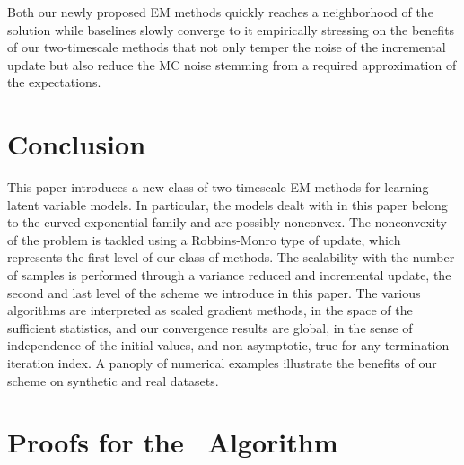 \documentclass[12pt]{article}
\begin{document}
Both our newly proposed EM methods quickly reaches a neighborhood of the solution while baselines slowly converge to it empirically stressing on the benefits of our two-timescale methods that not only temper the noise of the incremental update but also reduce the MC noise stemming from a required approximation of the expectations.



\vspace{-0.05in}
\section{Conclusion}
\vspace{-0.05in}

This paper introduces a new class of two-timescale EM methods for learning latent variable models.
In particular, the models dealt with in this paper belong to the curved exponential family and are possibly nonconvex.
The nonconvexity of the problem is tackled using a Robbins-Monro type of update, which represents the {first level} of our class of methods.
The scalability with the number of samples is performed through a variance reduced and incremental update, the {second} and last level of the scheme we introduce in this paper.
The various algorithms are interpreted as scaled gradient methods, in the space of the sufficient statistics, and our convergence results are {global}, in the sense of independence of the initial values, and {non-asymptotic}, \ie true for any termination iteration index.
A panoply of numerical examples illustrate the benefits of our scheme on synthetic and real datasets.





\newpage


\newpage




\appendix

\section{Proofs for the \ISAEM\ Algorithm}
\end{document}
